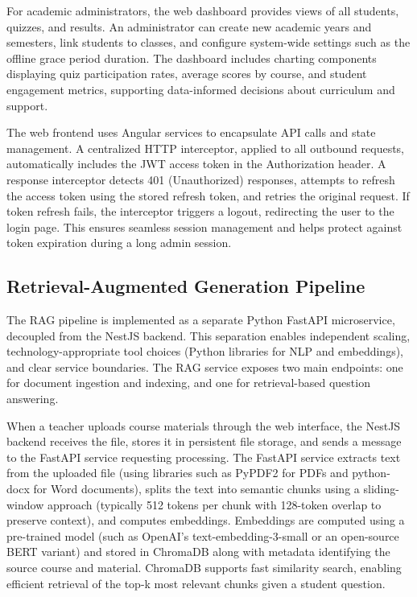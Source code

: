 \documentclass[a4paper,9pt,twocolumn]{extarticle}
\begin{document}
For academic administrators, the web dashboard provides views of all students, quizzes, and results. An administrator can create new academic years and semesters, link students to classes, and configure system-wide settings such as the offline grace period duration. The dashboard includes charting components displaying quiz participation rates, average scores by course, and student engagement metrics, supporting data-informed decisions about curriculum and support.

The web frontend uses Angular services to encapsulate API calls and state management. A centralized HTTP interceptor, applied to all outbound requests, automatically includes the JWT access token in the Authorization header. A response interceptor detects 401 (Unauthorized) responses, attempts to refresh the access token using the stored refresh token, and retries the original request. If token refresh fails, the interceptor triggers a logout, redirecting the user to the login page. This ensures seamless session management and helps protect against token expiration during a long admin session.

\subsection{Retrieval-Augmented Generation Pipeline}
\label{sec:impl:rag}

The RAG pipeline is implemented as a separate Python FastAPI microservice, decoupled from the NestJS backend. This separation enables independent scaling, technology-appropriate tool choices (Python libraries for NLP and embeddings), and clear service boundaries. The RAG service exposes two main endpoints: one for document ingestion and indexing, and one for retrieval-based question answering.

When a teacher uploads course materials through the web interface, the NestJS backend receives the file, stores it in persistent file storage, and sends a message to the FastAPI service requesting processing. The FastAPI service extracts text from the uploaded file (using libraries such as PyPDF2 for PDFs and python-docx for Word documents), splits the text into semantic chunks using a sliding-window approach (typically 512 tokens per chunk with 128-token overlap to preserve context), and computes embeddings. Embeddings are computed using a pre-trained model (such as OpenAI's text-embedding-3-small or an open-source BERT variant) and stored in ChromaDB along with metadata identifying the source course and material. ChromaDB supports fast similarity search, enabling efficient retrieval of the top-k most relevant chunks given a student question.
\end{document}
